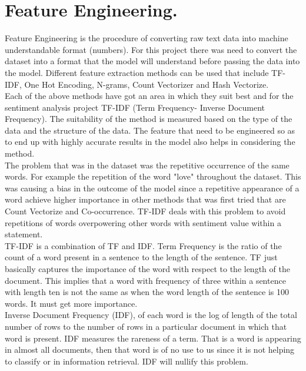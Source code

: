 \documentclass[12pt]{report}
\begin{document}
	
	\section{Feature Engineering.}
	Feature Engineering is the procedure of converting raw text data into machine understandable format (numbers). For this project there was need to convert the dataset into a format that the model will understand before passing the data into the model. Different feature extraction methods can be used that include TF-IDF, One Hot Encoding, N-grams, Count Vectorizer and Hash Vectorize.\\
	
	Each of the above methods have got an area in which they suit best and for the sentiment analysis project TF-IDF (Term Frequency- Inverse Document Frequency). The suitability of the method is measured based on the type of the data and the structure of the data. The feature that need to be engineered so as to end up with highly accurate results in the model also helps in considering the method.\\
	
	The problem that was in the dataset was the repetitive occurrence of the same words. For example the repetition of the word "love" throughout the dataset. This was causing a bias in the outcome of the model since a repetitive appearance of a word achieve higher importance in other methods that was first tried that are Count Vectorize and Co-occurrence.  TF-IDF deals with this problem to avoid repetitions of words overpowering other words with sentiment value within a statement.\\
	
	TF-IDF is a combination of TF and IDF. Term Frequency is the ratio of the count of a word present in a sentence to the length of the sentence. TF just basically captures the importance of the word with respect to the length of the document. This implies that a word with frequency of three within a sentence with length ten is not the same as when the word length of the sentence is 100 words. It must get more importance.\\
	
	Inverse Document Frequency (IDF), of each word is the log of length of the total number of rows to the number of rows in a particular document in which that word is present. IDF measures the rareness of a term. That is a word is appearing in almost all documents, then that word is of no use to us since it is not helping to classify or in information retrieval. IDF will nullify this problem.\\
	
\end{document}
